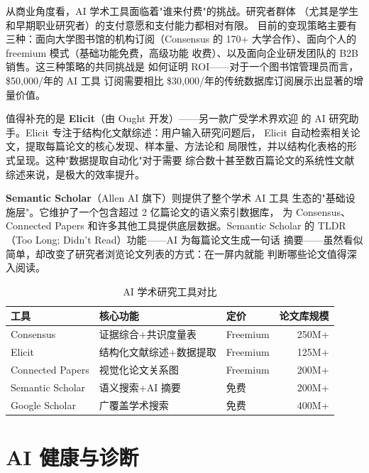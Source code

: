 从商业角度看，AI 学术工具面临着"谁来付费"的挑战。研究者群体
（尤其是学生和早期职业研究者）的支付意愿和支付能力都相对有限。
目前的变现策略主要有三种：面向大学图书馆的机构订阅（Consensus 的
170+ 大学合作）、面向个人的 freemium 模式（基础功能免费，高级功能
收费）、以及面向企业研发团队的 B2B 销售。这三种策略的共同挑战是
如何证明 ROI——对于一个图书馆管理员而言，\$50,000/年的 AI 工具
订阅需要相比 \$30,000/年的传统数据库订阅展示出显著的增量价值。

值得补充的是 \textbf{Elicit}（由 Ought 开发）——另一款广受学术界欢迎
的 AI 研究助手。Elicit 专注于结构化文献综述：用户输入研究问题后，
Elicit 自动检索相关论文，提取每篇论文的核心发现、样本量、方法论和
局限性，并以结构化表格的形式呈现。这种"数据提取自动化"对于需要
综合数十甚至数百篇论文的系统性文献综述来说，是极大的效率提升。

\textbf{Semantic Scholar}（Allen AI 旗下）则提供了整个学术 AI 工具
生态的"基础设施层"。它维护了一个包含超过 2 亿篇论文的语义索引数据库，
为 Consensus、Connected Papers 和许多其他工具提供底层数据。Semantic
Scholar 的 TLDR（Too Long; Didn't Read）功能——AI 为每篇论文生成一句话
摘要——虽然看似简单，却改变了研究者浏览论文列表的方式：在一屏内就能
判断哪些论文值得深入阅读。

\begin{table}[htbp]
\centering
\caption{AI 学术研究工具对比}
\label{tab:academic-tools}
\small
\begin{tabularx}{\textwidth}{l X l r}
\toprule
\rowcolor{figLightGray}
\textbf{工具} & \textbf{核心功能} & \textbf{定价} & \textbf{论文库规模} \\
\midrule
Consensus          & 证据综合+共识度量表       & Freemium    & 250M+ \\
Elicit             & 结构化文献综述+数据提取   & Freemium    & 125M+ \\
Connected Papers   & 视觉化论文关系图           & Freemium    & 200M+ \\
Semantic Scholar   & 语义搜索+AI 摘要           & 免费        & 200M+ \\
Google Scholar     & 广覆盖学术搜索             & 免费        & 400M+ \\
\bottomrule
\end{tabularx}
\end{table}



\section{AI 健康与诊断}
\label{sec:life-health}


